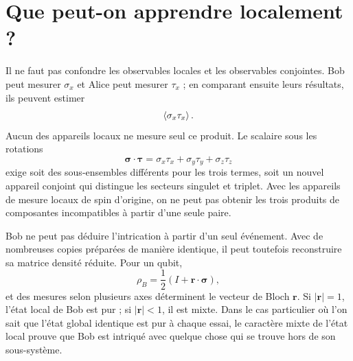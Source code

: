 \section{Que peut-on apprendre localement ?}

Il ne faut pas confondre les observables locales et les observables conjointes. Bob peut mesurer \(\sigma_x\) et Alice peut mesurer \(\tau_x\) ; en comparant ensuite leurs résultats, ils peuvent estimer
\begin{equation}
\left\langle\sigma_x\tau_x\right\rangle.
\end{equation}
Aucun des appareils locaux ne mesure seul ce produit. Le scalaire sous les rotations
\begin{equation}
\boldsymbol{\sigma}\cdot\boldsymbol{\tau}
=\sigma_x\tau_x+\sigma_y\tau_y+\sigma_z\tau_z
\end{equation}
exige soit des sous-ensembles différents pour les trois termes, soit un nouvel appareil conjoint qui distingue les secteurs singulet et triplet. Avec les appareils de mesure locaux de spin d'origine, on ne peut pas obtenir les trois produits de composantes incompatibles à partir d'une seule paire.

\begin{classroomqa}
\end{classroomqa}

Bob ne peut pas déduire l'intrication à partir d'un seul événement. Avec de nombreuses copies préparées de manière identique, il peut toutefois reconstruire sa matrice densité réduite. Pour un qubit,
\begin{equation}
\rho_B
=\frac12\left(
I+\mathbf r\cdot\boldsymbol{\sigma}
\right),
\label{eq:l7-bloch-density}
\end{equation}
et des mesures selon plusieurs axes déterminent le vecteur de Bloch \(\mathbf r\). Si \(|\mathbf r|=1\), l'état local de Bob est pur ; si \(|\mathbf r|<1\), il est mixte. Dans le cas particulier où l'on sait que l'état global identique est pur à chaque essai, le caractère mixte de l'état local prouve que Bob est intriqué avec quelque chose qui se trouve hors de son sous-système.

